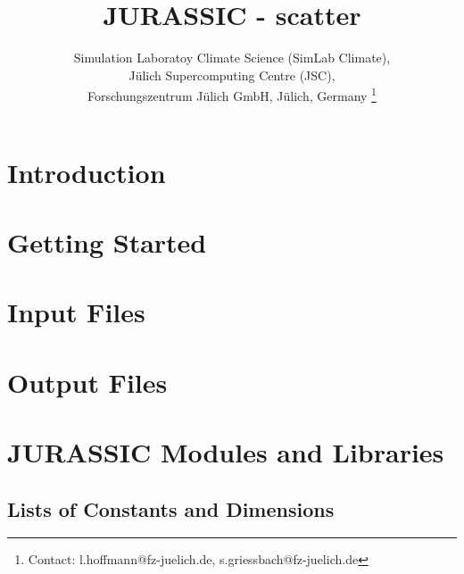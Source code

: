 \documentclass[12pt,a4paper,titlepage,twoside]{article}
\begin{document}

\author{Simulation Laboratoy Climate Science (SimLab Climate),\\
  J\"u{}lich Supercomputing Centre (JSC),\\ Forschungszentrum J\"u{}lich GmbH, J\"u{}lich, Germany \footnote{Contact: l.hoffmann@fz-juelich.de, s.griessbach@fz-juelich.de}}
\title{JURASSIC - scatter}

\maketitle
\tableofcontents
\clearpage

\section{Introduction}

\clearpage

\section{Getting Started}

\clearpage

\section{Input Files}
\label{sec:Input}

\clearpage

\section{Output Files}
\label{sec:Output}

\clearpage

\section{JURASSIC Modules and Libraries}
\label{sec:Modules}

\clearpage

\begin{appendix}
\section{Lists of Constants and Dimensions}

\end{appendix}

\clearpage
{}



%
\end{document}
